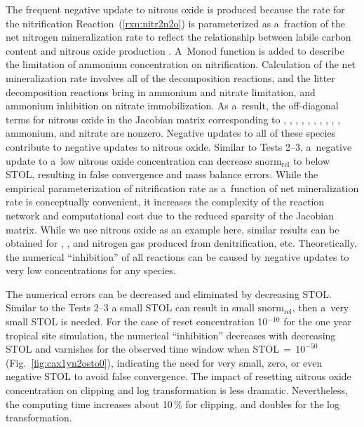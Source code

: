 \documentclass[gmdd, online, hvmath]{copernicus}
\begin{document}
      The frequent negative update to nitrous oxide is produced because the
      rate for the nitrification Reaction~(\ref{rxn:nitr2n2o}) is
      parameterized as a~fraction of the net nitrogen mineralization rate to
      reflect the relationship between labile carbon content and nitrous
      oxide production \citep{Parton1996}. A~Monod function is added to
      describe the limitation of ammonium concentration on nitrification.
      Calculation of the net mineralization rate involves all of the
      decomposition reactions, and the litter decomposition reactions bring
      in ammonium and nitrate limitation, and ammonium inhibition on nitrate
      immobilization. As a~result, the off-diagonal terms for nitrous oxide
      in the Jacobian matrix corresponding to , ,
      , , , , ,
      , , , ammonium, and nitrate are
      nonzero. Negative updates to all of these species contribute to
      negative updates to nitrous oxide. Similar to Tests 2--3, a~negative
      update to a~low nitrous oxide concentration can decrease
      $\text{snorm}_{\text{rel}}$ to below STOL, resulting in false
      convergence and mass balance errors. While the empirical
      parameterization of nitrification rate as a~function of net
      mineralization rate is conceptually convenient, it increases the
      complexity of the reaction network and computational cost due to the
      reduced sparsity of the Jacobian matrix. While we use nitrous oxide as
      an example here, similar results can be obtained for ,
      , and nitrogen gas produced from denitrification,
      etc. Theoretically, the numerical ``inhibition'' of all reactions can
      be caused by negative updates to very low concentrations for any
      species.

      The numerical errors can be decreased and eliminated by decreasing
      STOL.  Similar to the Tests 2--3 a
      small STOL can result in small $\text{snorm}_{\text{rel}}$, then
      a~very small STOL is needed. For the case of reset concentration
      10$^{-10}$ for the one year tropical site simulation, the numerical
      ``inhibition'' decreases with decreasing STOL and varnishes for the
      observed time window when STOL\,$=$\,$10^{-50}$
      (Fig.~\ref{fig:cax1yn2osto0}), indicating the need for very small,
      zero, or even negative STOL to avoid false convergence. The impact of
      resetting nitrous oxide concentration on clipping and log
      transformation is less dramatic. Nevertheless, the computing time
      increases about 10\,{\%} for clipping, and doubles for the log
      transformation.
\end{document}
